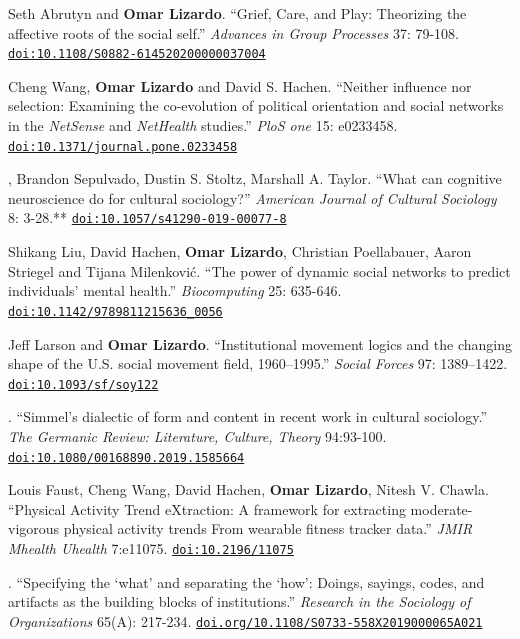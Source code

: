 \ind Seth Abrutyn and {\bf Omar Lizardo}. ``Grief, Care, and Play: Theorizing the affective roots of the social self.'' {\em Advances in Group Processes} 37: 79-108.  \href{https://doi.org/10.1108/S0882-614520200000037004}{\nolinkurl{doi:10.1108/S0882-614520200000037004}}

\ind Cheng Wang, {\bf Omar Lizardo} and David S. Hachen. ``Neither influence nor selection: Examining the co-evolution of political orientation and social networks in the {\em NetSense} and {\em NetHealth} studies.'' {\em PloS one} 15: e0233458. \href{https://doi.org/10.1371/journal.pone.0233458}{\nolinkurl{doi:10.1371/journal.pone.0233458}}

, Brandon Sepulvado, Dustin S. Stoltz, Marshall A. Taylor. ``What can cognitive neuroscience do for cultural sociology?'' {\em American Journal of Cultural Sociology} 8: 3-28.\textcolor{uclablue}{**} \newline\href{https://doi.org/10.1057/s41290-019-00077-8}{\nolinkurl{doi:10.1057/s41290-019-00077-8}}

\ind Shikang Liu, David Hachen, {\bf Omar Lizardo}, Christian Poellabauer, Aaron Striegel and Tijana Milenkovi\'{c}. ``The power of dynamic social networks to predict individuals' mental health.'' {\em Biocomputing} 25: 635-646. \href{https://doi.org/10.1142/9789811215636_0056}{\nolinkurl{doi:10.1142/9789811215636_0056}}


\ind Jeff Larson and {\bf Omar Lizardo}.  ``Institutional movement logics and the changing shape of the U.S. social movement field, 1960–1995.'' {\em Social Forces} 97: 1389–1422. \href{https://doi.org/10.1093/sf/soy122}{\nolinkurl{doi:10.1093/sf/soy122}}

. ``Simmel's dialectic of form and content in recent work in cultural sociology.'' {\em The Germanic Review: Literature, Culture, Theory} 94:93-100. \href{https://doi.org/10.1080/00168890.2019.1585664}{\nolinkurl{doi:10.1080/00168890.2019.1585664}}

\ind Louis Faust, Cheng Wang, David Hachen, {\bf Omar Lizardo}, Nitesh V. Chawla. ``Physical Activity Trend eXtraction: A framework for extracting moderate-vigorous physical activity trends From wearable fitness tracker data.'' {\em JMIR Mhealth Uhealth} 7:e11075. \href{https://doi.org/10.2196/11075}{\nolinkurl{doi:10.2196/11075}}

. ``Specifying the `what' and separating the `how': Doings, sayings, codes, and artifacts as the building blocks of institutions.'' {\em Research in the Sociology of Organizations} 65(A): 217-234. \newline \href{https://doi.org/10.1108/S0733-558X2019000065A021}{\nolinkurl{doi.org/10.1108/S0733-558X2019000065A021}}

